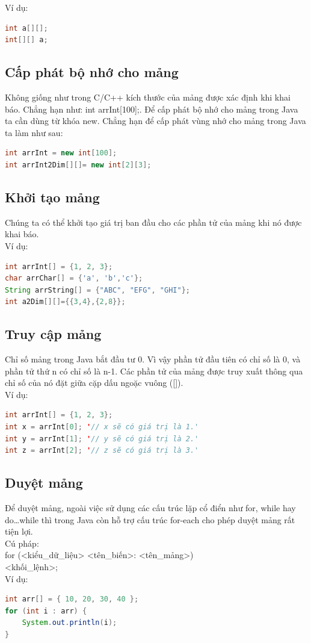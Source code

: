 \indent Ví dụ:
\begin{lstlisting}[escapechar=',language=java]	
int a[][];
int[][] a;
\end{lstlisting}

\subsection{Cấp phát bộ nhớ cho mảng}
\indent Không giống như trong C/C++ kích thước của mảng được xác định khi khai báo. Chẳng hạn như: {\ttfamily int arrInt[100];}. Để cấp phát bộ nhớ cho mảng trong Java ta cần dùng từ khóa {\ttfamily new}. Chẳng hạn để cấp phát vùng nhớ cho mảng trong Java ta làm như sau: 
\begin{lstlisting}[escapechar=',language=java]	
int arrInt = new int[100];
int arrInt2Dim[][]= new int[2][3];
\end{lstlisting}

\subsection{Khởi tạo mảng}
\indent Chúng ta có thể khởi tạo giá trị ban đầu cho các phần tử của mảng khi nó được khai báo.\\
\indent Ví dụ:
\begin{lstlisting}[escapechar=!,language=java]	
int arrInt[] = {1, 2, 3};
char arrChar[] = {'a', 'b','c'};
String arrString[] = {"ABC", "EFG", "GHI"};
int a2Dim[][]={{3,4},{2,8}};
\end{lstlisting}

\subsection{Truy cập mảng}
\indent Chỉ số mảng trong Java bắt đầu tư 0. Vì vậy phần tử đầu tiên có chỉ số là 0, và phần tử thứ n có chỉ số là n-1. Các phần tử của mảng được truy xuất thông qua chỉ số của nó đặt giữa cặp dấu ngoặc vuông ([]).\\
\indent Ví dụ:
\begin{lstlisting}[escapechar=',language=java]	
int arrInt[] = {1, 2, 3};
int x = arrInt[0]; '// x sẽ có giá trị là 1.'
int y = arrInt[1]; '// y sẽ có giá trị là 2.'
int z = arrInt[2]; '// z sẽ có giá trị là 3.'
\end{lstlisting}

\subsection{Duyệt mảng}
\indent Để duyệt mảng, ngoài việc sử dụng các cấu trúc lặp cổ điển như {\ttfamily for, while hay do…while} thì trong Java còn hỗ trợ cấu trúc {\ttfamily for-each} cho phép duyệt mảng rất tiện lợi.\\
\indent Cú pháp: \\
{\ttfamily
for (<kiểu\_dữ\_liệu> <tên\_biến>: <tên\_mảng>) {\\
\indent <khối\_lệnh>;
}}\\
\indent Ví dụ:
\begin{lstlisting}[escapechar=!,language=java]	
int arr[] = { 10, 20, 30, 40 };
for (int i : arr) {
	System.out.println(i);
}
\end{lstlisting}


